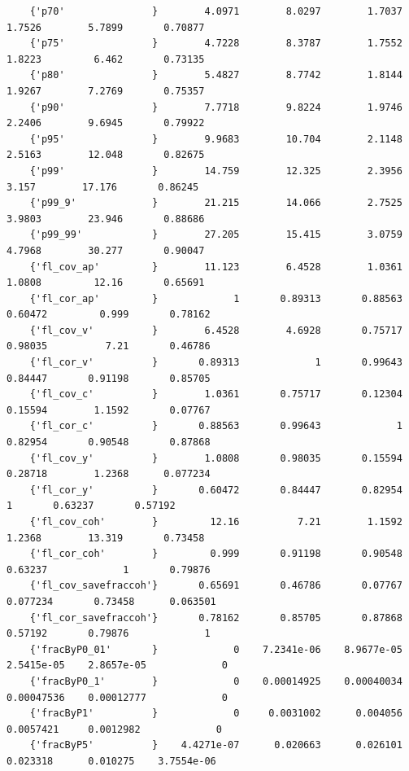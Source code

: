 \documentclass[
]{book}
\begin{document}
\begin{verbatim}
    {'p70'               }        4.0971        8.0297        1.7037        1.7526        5.7899       0.70877 
    {'p75'               }        4.7228        8.3787        1.7552        1.8223         6.462       0.73135 
    {'p80'               }        5.4827        8.7742        1.8144        1.9267        7.2769       0.75357 
    {'p90'               }        7.7718        9.8224        1.9746        2.2406        9.6945       0.79922 
    {'p95'               }        9.9683        10.704        2.1148        2.5163        12.048       0.82675 
    {'p99'               }        14.759        12.325        2.3956         3.157        17.176       0.86245 
    {'p99_9'             }        21.215        14.066        2.7525        3.9803        23.946       0.88686 
    {'p99_99'            }        27.205        15.415        3.0759        4.7968        30.277       0.90047 
    {'fl_cov_ap'         }        11.123        6.4528        1.0361        1.0808         12.16       0.65691 
    {'fl_cor_ap'         }             1       0.89313       0.88563       0.60472         0.999       0.78162 
    {'fl_cov_v'          }        6.4528        4.6928       0.75717       0.98035          7.21       0.46786 
    {'fl_cor_v'          }       0.89313             1       0.99643       0.84447       0.91198       0.85705 
    {'fl_cov_c'          }        1.0361       0.75717       0.12304       0.15594        1.1592       0.07767 
    {'fl_cor_c'          }       0.88563       0.99643             1       0.82954       0.90548       0.87868 
    {'fl_cov_y'          }        1.0808       0.98035       0.15594       0.28718        1.2368      0.077234 
    {'fl_cor_y'          }       0.60472       0.84447       0.82954             1       0.63237       0.57192 
    {'fl_cov_coh'        }         12.16          7.21        1.1592        1.2368        13.319       0.73458 
    {'fl_cor_coh'        }         0.999       0.91198       0.90548       0.63237             1       0.79876 
    {'fl_cov_savefraccoh'}       0.65691       0.46786       0.07767      0.077234       0.73458      0.063501 
    {'fl_cor_savefraccoh'}       0.78162       0.85705       0.87868       0.57192       0.79876             1 
    {'fracByP0_01'       }             0    7.2341e-06    8.9677e-05    2.5415e-05    2.8657e-05             0 
    {'fracByP0_1'        }             0    0.00014925    0.00040034    0.00047536    0.00012777             0 
    {'fracByP1'          }             0     0.0031002      0.004056     0.0057421     0.0012982             0 
    {'fracByP5'          }    4.4271e-07      0.020663      0.026101      0.023318      0.010275    3.7554e-06 

\end{verbatim}
\end{document}
